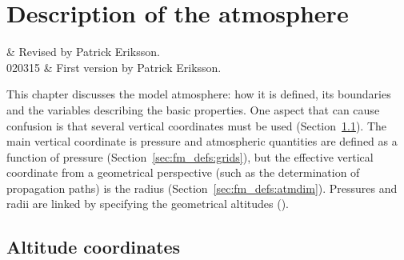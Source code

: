 \chapter{Description of the atmosphere}
 \label{sec:atmosphere}

 & Revised by Patrick Eriksson.\\ 
 020315 & First version by Patrick Eriksson.\\
\stophistory

\graphicspath{{Figs/atmosphere/}}

This chapter discusses the model atmosphere: how it is defined, its boundaries
and the variables describing the basic properties. One aspect that can cause
confusion is that several vertical coordinates must be used
(Section~\ref{sec:fm_defs:altitudes}). The main vertical coordinate is pressure
and atmospheric quantities are defined as a function of pressure
(Section~\ref{sec:fm_defs:grids}), but the effective vertical coordinate from a
geometrical perspective (such as the determination of propagation paths) is the
radius (Section~\ref{sec:fm_defs:atmdim}). Pressures and radii are linked by
specifying the geometrical altitudes ().


\section{Altitude coordinates}
\label{sec:fm_defs:altitudes}

